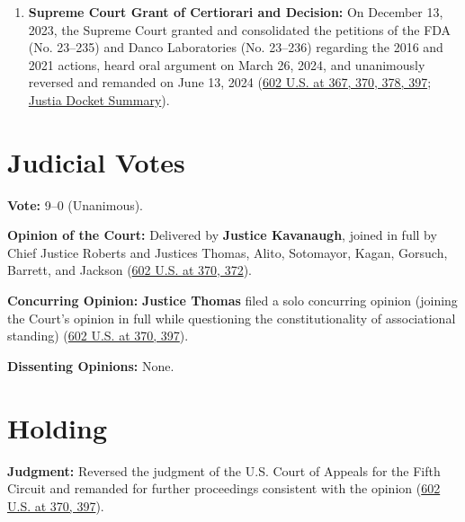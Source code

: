 \documentclass[12pt]{article}
\begin{document}
\begin{enumerate}
\item \textbf{Supreme Court Grant of Certiorari and Decision:} On December 13, 2023, the Supreme Court granted and consolidated the petitions of the FDA (No. 23--235) and Danco Laboratories (No. 23--236) regarding the 2016 and 2021 actions, heard oral argument on March 26, 2024, and unanimously reversed and remanded on June 13, 2024 (\href{https://www.supremecourt.gov/opinions/23pdf/602us1r35_bqmd.pdf}{602 U.S. at 367, 370, 378, 397}; \href{https://supreme.justia.com/cases/federal/us/602/23-235/}{Justia Docket Summary}).
\end{enumerate}

\section{Judicial Votes}

\textbf{Vote:} 9--0 (Unanimous).

\textbf{Opinion of the Court:} Delivered by \textbf{Justice Kavanaugh}, joined in full by Chief Justice Roberts and Justices Thomas, Alito, Sotomayor, Kagan, Gorsuch, Barrett, and Jackson (\href{https://www.supremecourt.gov/opinions/23pdf/602us1r35_bqmd.pdf}{602 U.S. at 370, 372}).

\textbf{Concurring Opinion:} \textbf{Justice Thomas} filed a solo concurring opinion (joining the Court's opinion in full while questioning the constitutionality of associational standing) (\href{https://www.supremecourt.gov/opinions/23pdf/602us1r35_bqmd.pdf}{602 U.S. at 370, 397}).

\textbf{Dissenting Opinions:} None.

\section{Holding}

\textbf{Judgment:} Reversed the judgment of the U.S. Court of Appeals for the Fifth Circuit and remanded for further proceedings consistent with the opinion (\href{https://www.supremecourt.gov/opinions/23pdf/602us1r35_bqmd.pdf}{602 U.S. at 370, 397}).
\end{document}
